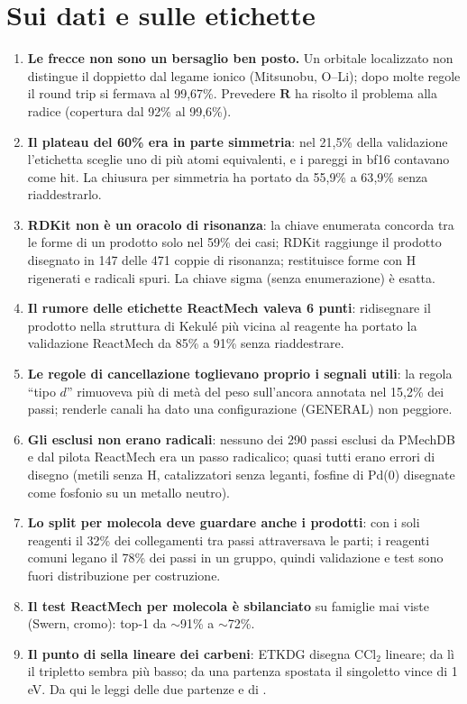 \documentclass[11pt,a4paper]{report}
\newcommand{\code}[1]{\texttt{\detokenize{#1}}}
\newcommand{\vb}[1]{\bm{#1}}
\begin{document}
\section{Sui dati e sulle etichette}
\begin{enumerate}[resume]
\item \textbf{Le frecce non sono un bersaglio ben posto.} Un orbitale localizzato non distingue il
  doppietto dal legame ionico (Mitsunobu, O--Li); dopo molte regole il round trip si fermava al
  99{,}67\%. Prevedere $\vb R$ ha risolto il problema alla radice (copertura dal 92\% al 99{,}6\%).
\item \textbf{Il plateau del 60\% era in parte simmetria}: nel 21{,}5\% della validazione l'etichetta
  sceglie uno di più atomi equivalenti, e i pareggi in bf16 contavano come hit. La chiusura per
  simmetria ha portato \code{flex_first} da 55{,}9\% a 63{,}9\% senza riaddestrarlo.
\item \textbf{RDKit non è un oracolo di risonanza}: la chiave enumerata concorda tra le forme di un
  prodotto solo nel 59\% dei casi; RDKit raggiunge il prodotto disegnato in 147 delle 471 coppie di
  risonanza; restituisce forme con H rigenerati e radicali spuri. La chiave sigma (senza enumerazione) è
  esatta.
\item \textbf{Il rumore delle etichette ReactMech valeva 6 punti}: ridisegnare il prodotto nella
  struttura di Kekulé più vicina al reagente ha portato la validazione ReactMech da 85\% a 91\% senza
  riaddestrare.
\item \textbf{Le regole di cancellazione toglievano proprio i segnali utili}: la regola \enquote{tipo
  $d$} rimuoveva più di metà del peso sull'ancora annotata nel 15{,}2\% dei passi; renderle canali ha
  dato una configurazione (GENERAL) non peggiore.
\item \textbf{Gli esclusi non erano radicali}: nessuno dei 290 passi esclusi da PMechDB e dal pilota
  ReactMech era un passo radicalico; quasi tutti erano errori di disegno (metili senza H, catalizzatori
  senza leganti, fosfine di Pd(0) disegnate come fosfonio su un metallo neutro).
\item \textbf{Lo split per molecola deve guardare anche i prodotti}: con i soli reagenti il 32\% dei
  collegamenti tra passi attraversava le parti; i reagenti comuni legano il 78\% dei passi in un gruppo,
  quindi validazione e test sono fuori distribuzione per costruzione.
\item \textbf{Il test ReactMech per molecola è sbilanciato} su famiglie mai viste (Swern, cromo):
  top-1 da $\sim$91\% a $\sim$72\%.
\item \textbf{Il punto di sella lineare dei carbeni}: ETKDG disegna CCl$_2$ lineare; da lì il
  tripletto sembra più basso; da una partenza spostata il singoletto vince di 1\,eV. Da qui le leggi delle
  due partenze e di \code{BOND_FORMED}.
\end{enumerate}
\end{document}
